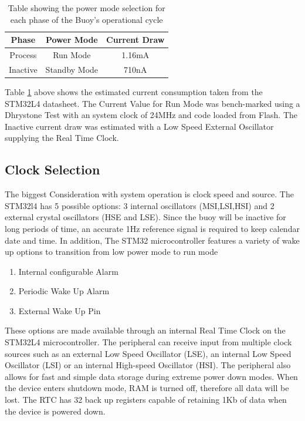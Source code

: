 \begin{table}[H]
    \centering
    \caption{Table showing the power mode selection for each phase of the Buoy's operational cycle}
    \begin{tabular}{|c|c|c|}
    \hline 
        Phase &  Power Mode & Current Draw \\
        \hline
        Process & Run Mode & 1.16mA\\
        Inactive & Standby Mode & 710nA\\
        \hline
    \end{tabular}

    \label{tab:powmode_cycle}
\end{table}

Table \ref{tab:powmode_cycle} above shows the estimated current consumption taken from the STM32L4 datasheet. The Current Value for Run Mode was bench-marked using a Dhrystone Test with an system clock of 24MHz and code loaded from Flash. The Inactive current draw was estimated with a Low Speed External Oscillator supplying the Real Time Clock. 

\subsection{Clock Selection}

The biggest Consideration with system operation is clock speed and source. The STM32l4 has 5 possible options: 3 internal oscillators (MSI,LSI,HSI) and 2 external crystal oscillators (HSE and LSE). Since the buoy will be inactive for long periods of time, an accurate 1Hz reference signal is required to keep calendar date and time. In addition, The STM32 microcontroller features a variety of wake up options to transition from low power mode to run mode
\begin{enumerate}
    \item Internal  configurable Alarm
    \item Periodic Wake Up Alarm
    \item External Wake Up Pin
\end{enumerate}

These options are made available through an internal Real Time Clock on the STM32L4 microcontroller. The peripheral can receive input from multiple clock sources such as an external Low Speed Oscillator (LSE), an internal Low Speed Oscillator (LSI) or an internal High-speed Oscillator (HSI). The peripheral also allows for fast and simple data storage during extreme power down modes. When the device enters shutdown mode, RAM is turned off, therefore all data will be lost. The RTC has 32 back up registers capable of retaining 1Kb of data when the device is powered down. \par 

